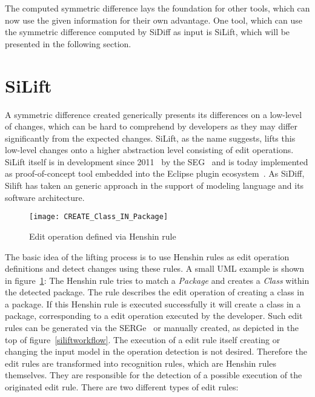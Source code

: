 The computed symmetric difference lays the foundation for other
tools, which can now use the given information for their own advantage. One
tool, which can use the symmetric difference computed by SiDiff as input is
SiLift, which will be presented in the following section.
\section{SiLift}\label{environment_and_tools:silift}
A symmetric difference created generically presents its differences on a
low-level of changes, which can be hard to comprehend by developers as they may
differ significantly from the expected changes. SiLift, as the name suggests,
lifts this low-level changes onto a higher abstraction level consisting of edit
operations. SiLift itself is in development since 2011~\cite{rulebaseapproach}
by the \ac{SEG}~\cite{SEGURL} and is today implemented as proof-of-concept tool
embedded into the Eclipse plugin ecosystem~\cite{modelevolutionlifting}. As
SiDiff, Silift has taken an generic approach in the support of modeling language
and its software architecture.

 \begin{figure}[h!]
\begin{center}
\texttt{[image: CREATE\_Class\_IN\_Package]}\\
\end{center}
\caption{Edit operation defined via Henshin rule}
\label{create_class_in_package}
\end{figure}

The basic idea of the lifting process is to use Henshin rules as edit operation
definitions and detect changes using these rules. A small \ac{UML} example is
shown in figure~\ref{create_class_in_package}: The Henshin rule tries to match a
\textit{Package} and creates a \textit{Class} within the detected package. The
rule describes the edit operation of creating a class in a package. If this
Henshin rule is executed successfully it will create a class in a package,
corresponding to a edit operation executed by the developer. Such edit rules can
be generated via the \ac{SERGe}~\cite{SERGEURL} or manually created, as
depicted in the top of figure~\ref{siliftworkflow}. The execution of a edit rule
itself creating or changing the input model in the operation
detection is not desired. Therefore the edit rules are transformed
into recognition rules, which are Henshin rules themselves. They are responsible
for the detection of a possible execution of the originated edit rule.
There are two different types of edit rules:

